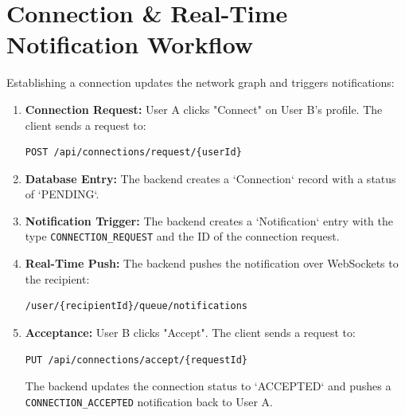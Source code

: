 \section{Connection \& Real-Time Notification Workflow}
Establishing a connection updates the network graph and triggers notifications:
\begin{enumerate}
    \item \textbf{Connection Request:} User A clicks "Connect" on User B's profile. The client sends a request to:
    \begin{lstlisting}[language=bash]
    POST /api/connections/request/{userId}
    \end{lstlisting}
    \item \textbf{Database Entry:} The backend creates a `Connection` record with a status of `PENDING`.
    \item \textbf{Notification Trigger:} The backend creates a `Notification` entry with the type \texttt{CONNECTION\_REQUEST} and the ID of the connection request.
    \item \textbf{Real-Time Push:} The backend pushes the notification over WebSockets to the recipient:
    \begin{lstlisting}[language=bash]
    /user/{recipientId}/queue/notifications
    \end{lstlisting}
    \item \textbf{Acceptance:} User B clicks "Accept". The client sends a request to:
    \begin{lstlisting}[language=bash]
    PUT /api/connections/accept/{requestId}
    \end{lstlisting}
    The backend updates the connection status to `ACCEPTED` and pushes a \texttt{CONNECTION\_ACCEPTED} notification back to User A.
\end{enumerate}

